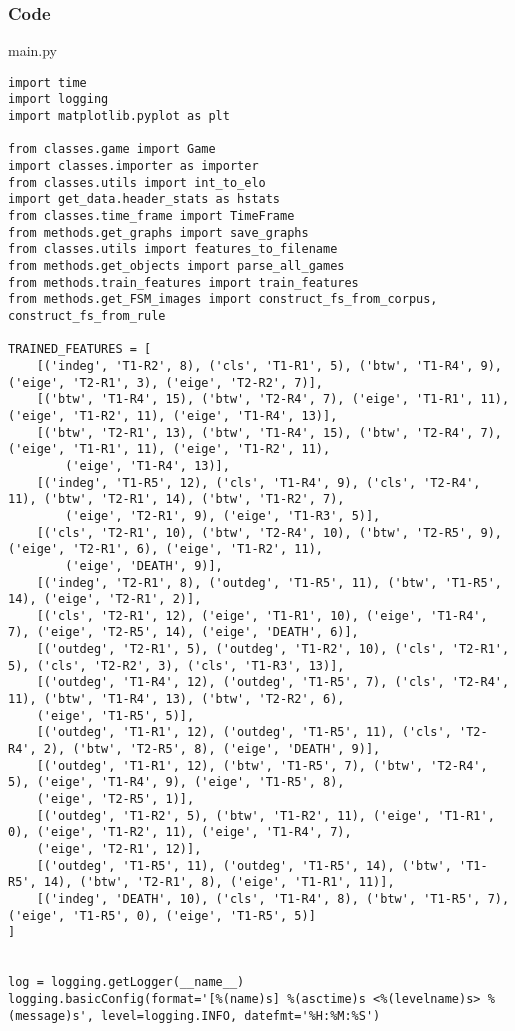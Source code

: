 \documentclass{beamer}
\begin{document}
\begin{frame}[fragile]
    \frametitle{Code}
    \scriptsize
    main.py \newline
    \fontsize{3pt}{5pt}\selectfont
    \begin{verbatim}
import time
import logging
import matplotlib.pyplot as plt

from classes.game import Game
import classes.importer as importer
from classes.utils import int_to_elo
import get_data.header_stats as hstats
from classes.time_frame import TimeFrame
from methods.get_graphs import save_graphs
from classes.utils import features_to_filename
from methods.get_objects import parse_all_games
from methods.train_features import train_features
from methods.get_FSM_images import construct_fs_from_corpus, construct_fs_from_rule

TRAINED_FEATURES = [
    [('indeg', 'T1-R2', 8), ('cls', 'T1-R1', 5), ('btw', 'T1-R4', 9), ('eige', 'T2-R1', 3), ('eige', 'T2-R2', 7)],
    [('btw', 'T1-R4', 15), ('btw', 'T2-R4', 7), ('eige', 'T1-R1', 11), ('eige', 'T1-R2', 11), ('eige', 'T1-R4', 13)],
    [('btw', 'T2-R1', 13), ('btw', 'T1-R4', 15), ('btw', 'T2-R4', 7), ('eige', 'T1-R1', 11), ('eige', 'T1-R2', 11),
        ('eige', 'T1-R4', 13)],
    [('indeg', 'T1-R5', 12), ('cls', 'T1-R4', 9), ('cls', 'T2-R4', 11), ('btw', 'T2-R1', 14), ('btw', 'T1-R2', 7),
        ('eige', 'T2-R1', 9), ('eige', 'T1-R3', 5)],
    [('cls', 'T2-R1', 10), ('btw', 'T2-R4', 10), ('btw', 'T2-R5', 9), ('eige', 'T2-R1', 6), ('eige', 'T1-R2', 11),
        ('eige', 'DEATH', 9)],
    [('indeg', 'T2-R1', 8), ('outdeg', 'T1-R5', 11), ('btw', 'T1-R5', 14), ('eige', 'T2-R1', 2)],
    [('cls', 'T2-R1', 12), ('eige', 'T1-R1', 10), ('eige', 'T1-R4', 7), ('eige', 'T2-R5', 14), ('eige', 'DEATH', 6)],
    [('outdeg', 'T2-R1', 5), ('outdeg', 'T1-R2', 10), ('cls', 'T2-R1', 5), ('cls', 'T2-R2', 3), ('cls', 'T1-R3', 13)],
    [('outdeg', 'T1-R4', 12), ('outdeg', 'T1-R5', 7), ('cls', 'T2-R4', 11), ('btw', 'T1-R4', 13), ('btw', 'T2-R2', 6),
    ('eige', 'T1-R5', 5)],
    [('outdeg', 'T1-R1', 12), ('outdeg', 'T1-R5', 11), ('cls', 'T2-R4', 2), ('btw', 'T2-R5', 8), ('eige', 'DEATH', 9)],
    [('outdeg', 'T1-R1', 12), ('btw', 'T1-R5', 7), ('btw', 'T2-R4', 5), ('eige', 'T1-R4', 9), ('eige', 'T1-R5', 8),
    ('eige', 'T2-R5', 1)],
    [('outdeg', 'T1-R2', 5), ('btw', 'T1-R2', 11), ('eige', 'T1-R1', 0), ('eige', 'T1-R2', 11), ('eige', 'T1-R4', 7),
    ('eige', 'T2-R1', 12)],
    [('outdeg', 'T1-R5', 11), ('outdeg', 'T1-R5', 14), ('btw', 'T1-R5', 14), ('btw', 'T2-R1', 8), ('eige', 'T1-R1', 11)],
    [('indeg', 'DEATH', 10), ('cls', 'T1-R4', 8), ('btw', 'T1-R5', 7), ('eige', 'T1-R5', 0), ('eige', 'T1-R5', 5)]
]


log = logging.getLogger(__name__)
logging.basicConfig(format='[%(name)s] %(asctime)s <%(levelname)s> %(message)s', level=logging.INFO, datefmt='%H:%M:%S')
    \end{verbatim}
\end{frame}
\end{document}
